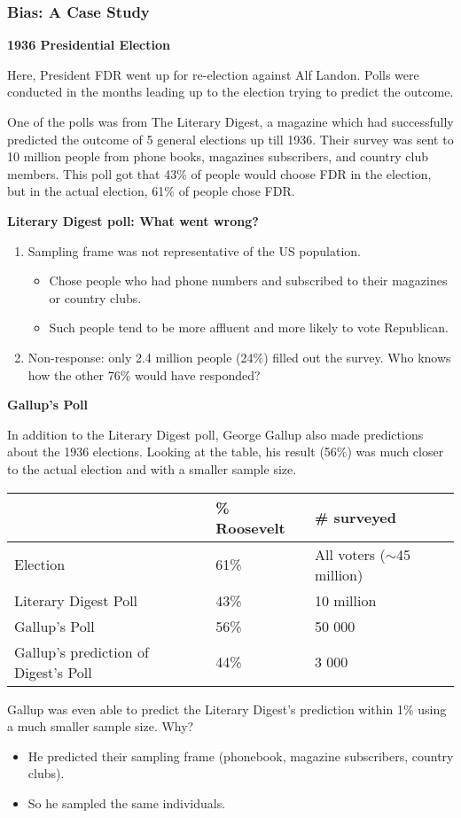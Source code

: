 \subsubsection{Bias: A Case Study}
\textbf{1936 Presidential Election}

Here, President FDR went up for re-election against Alf Landon. Polls were conducted in the months leading up to the election trying to predict the outcome.

One of the polls was from The Literary Digest, a magazine which had successfully predicted the outcome of 5 general elections up till 1936. Their survey was sent to 10 million people from phone books, magazines subscribers, and country club members. This poll got that 43\% of people would choose FDR in the election, but in the actual election, 61\% of people chose FDR.

\textbf{Literary Digest poll: What went wrong?}
\begin{enumerate}
\item Sampling frame was not representative of the US population.
\begin{itemize}
\item Chose people who had phone numbers and subscribed to their magazines or country clubs. 
\item Such people tend to be more affluent and more likely to vote Republican.
\end{itemize}
\item Non-response: only 2.4 million people (24\%) filled out the survey. Who knows how the other 76\% would have responded?
\end{enumerate}

\textbf{Gallup's Poll}

In addition to the Literary Digest poll, George Gallup also made predictions about the 1936 elections. Looking at the table, his result (56\%) was much closer to the actual election and with a smaller sample size.
\begin{center}
\begin{tabular}{@{}lll@{}}
\toprule
     & \% Roosevelt & \# surveyed \\
\midrule
    Election & 61\% & All voters ($\sim$45 million) \\
    Literary Digest Poll & 43\% & 10 million \\
    Gallup's Poll & 56\% & 50 000 \\
    Gallup's prediction of Digest's Poll & 44\% & 3 000 \\
\bottomrule
\end{tabular}
\end{center}
Gallup was even able to predict the Literary Digest's prediction within 1\% using a much smaller sample size. Why?
\begin{itemize}
\item He predicted their sampling frame (phonebook, magazine subscribers, country clubs).
\item So he sampled the same individuals.
\end{itemize}

